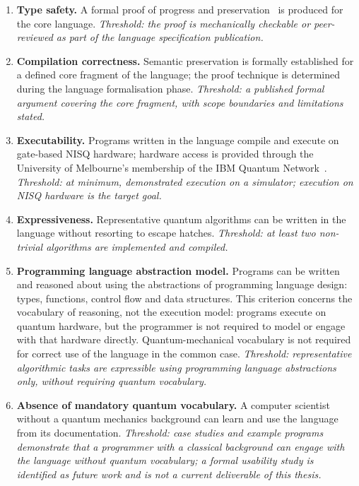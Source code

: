 \begin{enumerate}

    \item \textbf{Type safety.} A formal proof of progress and preservation~\cite{WrightFelleisen1994TypeSoundness} is produced for the core language.
    \textit{Threshold: the proof is mechanically checkable or peer-reviewed as part of the language specification publication.}

    \item \textbf{Compilation correctness.} Semantic preservation is formally established for a defined core fragment of the language; the proof technique is determined during the language formalisation phase.
    \textit{Threshold: a published formal argument covering the core fragment, with
    scope boundaries and limitations stated.}

    \item \textbf{Executability.} Programs written in the language compile and execute on gate-based NISQ hardware; hardware access is provided through the University of Melbourne's membership of the IBM Quantum Network~\cite{UoMIBMQuantumHub}.
    \textit{Threshold: at minimum, demonstrated execution on a simulator; execution on NISQ hardware is the target goal.}

    \item \textbf{Expressiveness.} Representative quantum algorithms can be written in the language without resorting to escape hatches.
    \textit{Threshold: at least two non-trivial algorithms are implemented and
    compiled.}

    \item \textbf{Programming language abstraction model.} Programs can be written and reasoned about using the abstractions of programming language design: types, functions, control flow and data structures.
    This criterion concerns the vocabulary of reasoning, not the execution model: programs execute on quantum hardware, but the programmer is not required to model or engage with that hardware directly.
    Quantum-mechanical vocabulary is not required for correct use of the language in the common case.
    \textit{Threshold: representative algorithmic tasks are expressible using programming language abstractions only, without requiring quantum vocabulary.}

    \item \textbf{Absence of mandatory quantum vocabulary.} A computer scientist without a quantum mechanics background can learn and use the language from its documentation.
    \textit{Threshold: case studies and example programs demonstrate that a programmer with a classical background can engage with the language without quantum vocabulary; a formal usability study is identified as future work and is not a current deliverable of this thesis.}

\end{enumerate}


